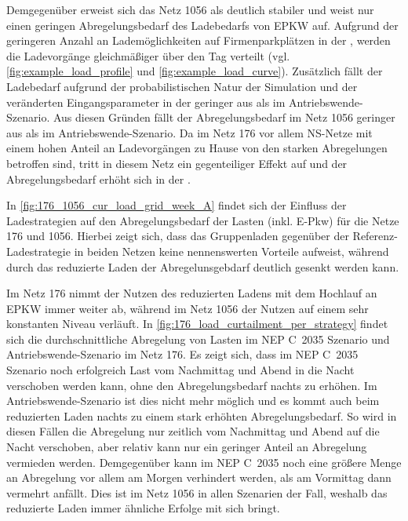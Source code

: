 Demgegenüber erweist sich das Netz \num{1056} als deutlich stabiler und weist nur einen geringen Abregelungsbedarf des Ladebedarfs von \gls{EPKW} auf.
Aufgrund der geringeren Anzahl an Lademöglichkeiten auf Firmenparkplätzen in der \SzeFirmenparkplatzdot, werden die Ladevorgänge gleichmäßiger über den Tag verteilt (vgl. \autoref{fig:example_load_profile} und \autoref{fig:example_load_curve}).
Zusätzlich fällt der Ladebedarf aufgrund der probabilistischen Natur der Simulation und der veränderten Eingangsparameter in der \SzeFirmenparkplatz geringer aus als im Antriebswende-Szenario.
Aus diesen Gründen fällt der Abregelungsbedarf im Netz \num{1056} geringer aus als im Antriebswende-Szenario.
Da im Netz \num{176} vor allem \gls{NS}-Netze mit einem hohen Anteil an Ladevorgängen zu Hause von den starken Abregelungen betroffen sind, tritt in diesem Netz ein gegenteiliger Effekt auf und der Abregelungsbedarf erhöht sich in der \SzeFirmenparkplatzdot.





In \autoref{fig:176_1056_cur_load_grid_week_A} findet sich der Einfluss der Ladestrategien auf den Abregelungsbedarf der Lasten (inkl. E-Pkw) für die Netze \num{176} und \num{1056}.
Hierbei zeigt sich, dass das Gruppenladen gegenüber der Referenz-Ladestrategie in beiden Netzen keine nennenswerten Vorteile aufweist, während durch das reduzierte Laden der Abregelunsgebdarf deutlich gesenkt werden kann.



Im Netz \num{176} nimmt der Nutzen des reduzierten Ladens mit dem Hochlauf an \gls{EPKW} immer weiter ab, während im Netz \num{1056} der Nutzen auf einem sehr konstanten Niveau verläuft.
In \autoref{fig:176_load_curtailment_per_strategy} findet sich die durchschnittliche Abregelung von Lasten im NEP C~\num{2035} Szenario und Antriebswende-Szenario im Netz \num{176}.
Es zeigt sich, dass im NEP C~\num{2035} Szenario noch erfolgreich Last vom Nachmittag und Abend in die Nacht verschoben werden kann, ohne den Abregelungsbedarf nachts zu erhöhen.
Im Antriebswende-Szenario ist dies nicht mehr möglich und es kommt auch beim reduzierten Laden nachts zu einem stark erhöhten Abregelungsbedarf.
So wird in diesen Fällen die Abregelung nur zeitlich vom Nachmittag und Abend auf die Nacht verschoben, aber relativ kann nur ein geringer Anteil an Abregelung vermieden werden.
Demgegenüber kann im NEP C~\num{2035} noch eine größere Menge an Abregelung vor allem am Morgen verhindert werden, als am Vormittag dann vermehrt anfällt.
Dies ist im Netz \num{1056} in allen Szenarien der Fall, weshalb das reduzierte Laden immer ähnliche Erfolge mit sich bringt.\medskip

